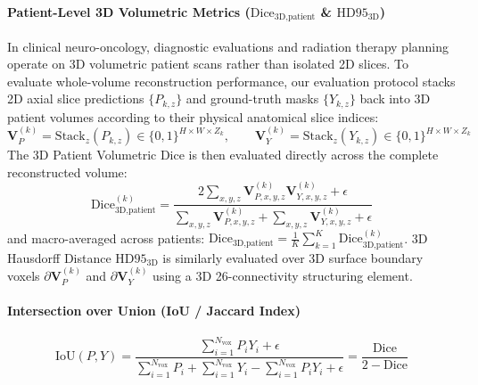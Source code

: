 \documentclass{article}
\begin{document}
\paragraph{Patient-Level 3D Volumetric Metrics ($\text{Dice}_{\text{3D,patient}}$ \& $\text{HD95}_{\text{3D}}$)}
In clinical neuro-oncology, diagnostic evaluations and radiation therapy planning operate on 3D volumetric patient scans rather than isolated 2D slices. To evaluate whole-volume reconstruction performance, our evaluation protocol stacks 2D axial slice predictions $\{P_{k, z}\}$ and ground-truth masks $\{Y_{k, z}\}$ back into 3D patient volumes according to their physical anatomical slice indices:
\begin{equation}
    \mathbf{V}_P^{(k)} = \text{Stack}_{z}\left( P_{k, z} \right) \in \{0, 1\}^{H \times W \times Z_k}, \qquad \mathbf{V}_Y^{(k)} = \text{Stack}_{z}\left( Y_{k, z} \right) \in \{0, 1\}^{H \times W \times Z_k}
\end{equation}
The 3D Patient Volumetric Dice is then evaluated directly across the complete reconstructed volume:
\begin{equation}
    \text{Dice}_{\text{3D,patient}}^{(k)} = \frac{2 \sum_{x,y,z} \mathbf{V}_{P, x,y,z}^{(k)} \mathbf{V}_{Y, x,y,z}^{(k)} + \epsilon}{\sum_{x,y,z} \mathbf{V}_{P, x,y,z}^{(k)} + \sum_{x,y,z} \mathbf{V}_{Y, x,y,z}^{(k)} + \epsilon}
\end{equation}
and macro-averaged across patients: $\text{Dice}_{\text{3D,patient}} = \frac{1}{K} \sum_{k=1}^K \text{Dice}_{\text{3D,patient}}^{(k)}$. 3D Hausdorff Distance $\text{HD95}_{\text{3D}}$ is similarly evaluated over 3D surface boundary voxels $\partial \mathbf{V}_P^{(k)}$ and $\partial \mathbf{V}_Y^{(k)}$ using a 3D 26-connectivity structuring element.

\paragraph{Intersection over Union (IoU / Jaccard Index)}
\begin{equation}
    \text{IoU}(P, Y) = \frac{\sum_{i=1}^{N_{\text{vox}}} P_i Y_i + \epsilon}{\sum_{i=1}^{N_{\text{vox}}} P_i + \sum_{i=1}^{N_{\text{vox}}} Y_i - \sum_{i=1}^{N_{\text{vox}}} P_i Y_i + \epsilon} = \frac{\text{Dice}}{2 - \text{Dice}}
\end{equation}
\end{document}
